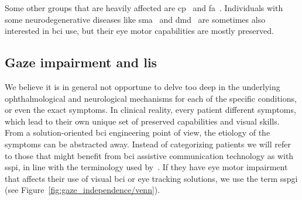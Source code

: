 Some other groups that are heavily affected are \ac{cp}~\cite{Fazzi2012} and
\ac{fa}~\cite{Fahey2008,Hocking2010,Furman1983}.
Individuals with some neurodegenerative diseases like
\ac{sma}~\cite{Anagnostou2021} and \ac{dmd}~\cite{Lui2001} are
sometimes also interested in \ac{bci} use, but their eye motor capabilities are
mostly preserved.

\subsection{Gaze impairment and \acl{lis}}

\newcommand\fnlis{\footnote{
Multiple definitions of \ac{lis} are encountered in
\ac{bci} and neurological literature.
Some definitions include only tetraplegic patients without eye movements used
for communications.
Others distinguish Complete Locked-in Syndrome (CLIS) with full body paralysis,
including no eye motor control at all, from a \ac{lis} state with some preserved eye
movements or minor motor output.
While some definitions only include stroke or \ac{tbi} patients with damage to
specific regions in the brain (midbrain, brainstem, or
cerebellum)~\cite{Smith2005},
it can also generally refer to the state of full body paralysis
or loss of muscle tone incurred in neurodegenerative diseases, combined with
the inability to speak, such as occurs in late stage ALS.
}}

\newcommand\fnwolpawcrit{\footnote{
\it``The first class consists of people who are truly totally locked-in (e.g.,
due to end-stage ALS or severe cerebral palsy), who have no remaining
useful neuromuscular control of any sort, including no eye movement.
\elide\ This class is very small. \elide\
The second class of potential \ac{bci} users comprises those who retain
a very limited capacity for neuromuscular control. This group includes
people who retain some useful eye movement or enough limb muscle
function to operate a single-switch system. Such control is often slow,
unreliable, or easily fatigued.
This group is much larger than the first.
}}

We believe it is in general not opportune to delve too deep in the underlying
ophthalmological and neurological mechanisms for each of the specific
conditions, or even the exact symptoms.
In clinical reality, every patient different symptoms, which lead to their own
unique set of preserved capabilities and visual skills.
From a solution-oriented \ac{bci} engineering point
of view, the etiology of the symptoms can be abstracted away.
Instead of categorizing patients we will refer to those that might benefit from
\ac{bci} assistive communication technology as with \ac{sspi}, in line with
the terminology used by~\textcite{FriedOken2020}.
If they have eye motor impairment that affects their use of visual \ac{bci} or
eye tracking solutions, we use the term \ac{sspgi} (see Figure~\ref{fig:gaze_independence/venn}).

